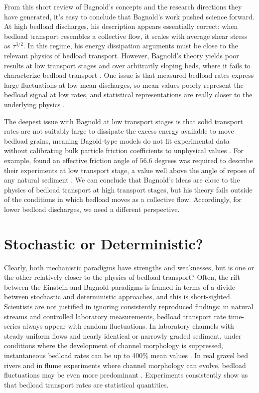 \documentclass{article}
\begin{document}
From this short review of Bagnold's concepts and the research directions they have generated, it's easy to conclude that Bagnold's work pushed science forward. 
At high bedload discharges, his description appears essentially correct: when bedload transport resembles a collective flow, it scales with average shear stress as $\tau^{3/2}$.
In this regime, his energy dissipation arguments must be close to the relevant physics of bedload transport. 
However, Bagnold's theory yields poor results at low transport stages and over arbitrarily sloping beds, where it fails to characterize bedload transport \citep{Engelund1976, Luque1976, Seminara2002, Martin2000}.
One issue is that measured bedload rates express large fluctuations at low mean discharges, so mean values poorly represent the bedload signal at low rates, and statistical representations are really closer to the underlying physics \citep{Ancey2008}. 

The deepest issue with Bagnold at low transport stages is that solid transport rates are not suitably large to dissipate the excess energy available to move bedload grains, meaning Bagold-type models do not fit experimental data without calibrating bulk particle friction coefficients to unphysical values \citep{Engelund1976, Luque1976, Nelson1995, Nino1998}.
For example, \citet{Nino1998} found an effective friction angle of $56.6$ degrees was required to describe their experiments at low transport stage, a value well above the angle of repose of any natural sediment \citep{Miller1966}.
We can conclude that Bagnold's ideas are close to the physics of bedload transport at high transport stages, but his theory fails outside of the conditions in which bedload moves as a collective flow. 
Accordingly, for lower bedload discharges, we need a different perspective. 


\section{Stochastic or Deterministic?}


Clearly, both mechanistic paradigms have strengths and weaknesses, but is one or the other relatively closer to the physics of bedload transport?  
Often, the rift between the Einstein and Bagnold paradigms is framed in terms of a divide between stochastic and deterministic approaches, and this is short-sighted. 
Scientists are not justified in ignoring consistently reproduced findings: in natural streams and controlled laboratory measurements, bedload transport rate time-series always appear with random fluctuations. 
In laboratory channels with steady uniform flows and nearly identical or narrowly graded sediment, under conditions where the development of channel morphology is suppressed, instantaneous bedload rates can be up to 400\% mean values \citep{Bohm2004, Ancey2008, Roseberry2012, Heyman2016}.
In real gravel bed rivers and in flume experiments where channel morphology can evolve, bedload fluctuations may be even more predominant \citep{Iseya1987, Kuhnle1988, Hoey1992, Cudden2003, Singh2009, Dhont2018}. 
Experiments consistently show us that bedload transport rates are statistical quantities.
\end{document}
